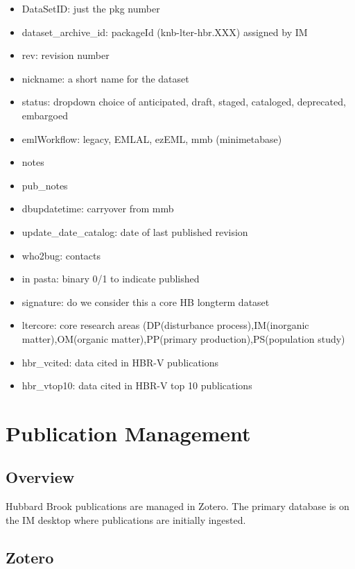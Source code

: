 \documentclass[
  letterpaper,
  DIV=11,
  numbers=noendperiod]{scrreprt}
\providecommand{\tightlist}{%
  \setlength{\itemsep}{0pt}\setlength{\parskip}{0pt}}\usepackage{longtable,booktabs,array}
\begin{document}
\begin{itemize}
\tightlist
\item
  DataSetID: just the pkg number
\item
  dataset\_archive\_id: packageId (knb-lter-hbr.XXX) assigned by IM
\item
  rev: revision number
\item
  nickname: a short name for the dataset
\item
  status: dropdown choice of anticipated, draft, staged, cataloged,
  deprecated, embargoed
\item
  emlWorkflow: legacy, EMLAL, ezEML, mmb (minimetabase)
\item
  notes
\item
  pub\_notes
\item
  dbupdatetime: carryover from mmb
\item
  update\_date\_catalog: date of last published revision
\item
  who2bug: contacts
\item
  in pasta: binary 0/1 to indicate published
\item
  signature: do we consider this a core HB longterm dataset
\item
  ltercore: core research areas (DP(disturbance process),IM(inorganic
  matter),OM(organic matter),PP(primary production),PS(population study)
\item
  hbr\_vcited: data cited in HBR-V publications
\item
  hbr\_vtop10: data cited in HBR-V top 10 publications
\end{itemize}


\chapter{Publication Management}\label{publication-management}

\section{Overview}\label{overview-3}

Hubbard Brook publications are managed in Zotero. The primary database
is on the IM desktop where publications are initially ingested.

\section{Zotero}\label{zotero}
\end{document}
